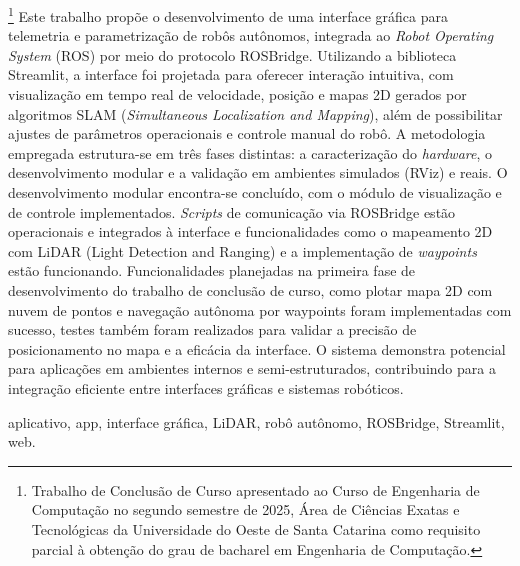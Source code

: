  \vspace{0.3cm}
  \begin{resumo}
    \noindent\footnote{Trabalho de Conclusão de Curso apresentado ao Curso de Engenharia de Computação no segundo semestre de 2025, Área de Ciências Exatas e Tecnológicas da Universidade do Oeste de Santa Catarina como requisito parcial à obtenção do grau de bacharel em Engenharia de Computação.}
     Este trabalho propõe o desenvolvimento de uma interface gráfica para telemetria e parametrização de robôs autônomos, integrada ao \textit{Robot Operating System} (ROS) por meio do protocolo ROSBridge. Utilizando a biblioteca Streamlit, a interface foi projetada para oferecer interação intuitiva, com visualização em tempo real de velocidade, posição e mapas 2D gerados por algoritmos SLAM (\textit{Simultaneous Localization and Mapping}), além de possibilitar ajustes de parâmetros operacionais e controle manual do robô. A metodologia empregada estrutura-se em três fases distintas: a caracterização do \textit{hardware}, o desenvolvimento modular e a validação em ambientes simulados (RViz) e reais. O desenvolvimento modular encontra-se concluído, com o módulo de visualização e de controle implementados. \textit{Scripts} de comunicação via ROSBridge estão operacionais e integrados à interface e funcionalidades como o mapeamento 2D com LiDAR (Light Detection and Ranging) e a implementação de \textit{waypoints} estão funcionando. Funcionalidades planejadas na primeira fase de desenvolvimento do trabalho de conclusão de curso, como plotar mapa 2D com nuvem de pontos e navegação autônoma por waypoints foram implementadas com sucesso, testes também foram realizados para validar a precisão de posicionamento no mapa e a eficácia da interface. O sistema demonstra potencial para aplicações em ambientes internos e semi-estruturados, contribuindo para a integração eficiente entre interfaces gráficas e sistemas robóticos.
     
  \end{resumo}
  
  \begin{palavraschave}
    aplicativo, app, interface gráfica, LiDAR, robô autônomo, ROSBridge, Streamlit, web.
  \end{palavraschave}
  
  \vspace{0.5cm}
  
